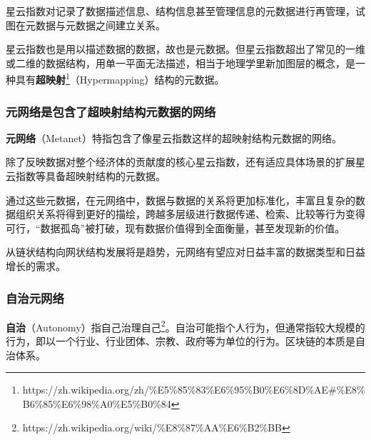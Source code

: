 星云指数对记录了数据描述信息、结构信息甚至管理信息的元数据进行再管理，试图在元数据与元数据之间建立关系。

星云指数也是用以描述数据的数据，故也是元数据。但星云指数超出了常见的一维或二维的数据结构，用单一平面无法描述，相当于地理学里新加图层的概念，是一种具有\textbf{超映射}\footnote{https://zh.wikipedia.org/zh/\%E5\%85\%83\%E6\%95\%B0\%E6\%8D\%AE\#\%E8\%B6\%85\%E6\%98\%A0\%E5\%B0\%84}（Hypermapping）结构的元数据。

\subsubsection{元网络是包含了超映射结构元数据的网络}
\textbf{元网络}（Metanet）特指包含了像星云指数这样的超映射结构元数据的网络。

除了反映数据对整个经济体的贡献度的核心星云指数，还有适应具体场景的扩展星云指数等具备超映射结构的元数据。

通过这些元数据，在元网络中，数据与数据的关系将更加标准化，丰富且复杂的数据组织关系将得到更好的描绘，跨越多层级进行数据传递、检索、比较等行为变得可行，“数据孤岛”被打破，现有数据价值得到全面衡量，甚至发现新的价值。

从链状结构向网状结构发展将是趋势，元网络有望应对日益丰富的数据类型和日益增长的需求。

\subsubsection{自治元网络}
\textbf{自治}（Autonomy）指自己治理自己\footnote{https://zh.wikipedia.org/wiki/\%E8\%87\%AA\%E6\%B2\%BB}。自治可能指个人行为，但通常指较大规模的行为，即以一个行业、行业团体、宗教、政府等为单位的行为。区块链的本质是自治体系。

